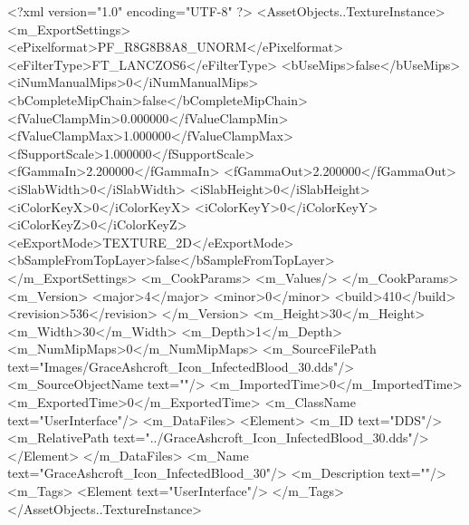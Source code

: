 <?xml version="1.0" encoding="UTF-8" ?>
<AssetObjects..TextureInstance>
	<m_ExportSettings>
		<ePixelformat>PF_R8G8B8A8_UNORM</ePixelformat>
		<eFilterType>FT_LANCZOS6</eFilterType>
		<bUseMips>false</bUseMips>
		<iNumManualMips>0</iNumManualMips>
		<bCompleteMipChain>false</bCompleteMipChain>
		<fValueClampMin>0.000000</fValueClampMin>
		<fValueClampMax>1.000000</fValueClampMax>
		<fSupportScale>1.000000</fSupportScale>
		<fGammaIn>2.200000</fGammaIn>
		<fGammaOut>2.200000</fGammaOut>
		<iSlabWidth>0</iSlabWidth>
		<iSlabHeight>0</iSlabHeight>
		<iColorKeyX>0</iColorKeyX>
		<iColorKeyY>0</iColorKeyY>
		<iColorKeyZ>0</iColorKeyZ>
		<eExportMode>TEXTURE_2D</eExportMode>
		<bSampleFromTopLayer>false</bSampleFromTopLayer>
	</m_ExportSettings>
	<m_CookParams>
		<m_Values/>
	</m_CookParams>
	<m_Version>
		<major>4</major>
		<minor>0</minor>
		<build>410</build>
		<revision>536</revision>
	</m_Version>
	<m_Height>30</m_Height>
	<m_Width>30</m_Width>
	<m_Depth>1</m_Depth>
	<m_NumMipMaps>0</m_NumMipMaps>
	<m_SourceFilePath text="Images/GraceAshcroft_Icon_InfectedBlood_30.dds"/>
	<m_SourceObjectName text=""/>
	<m_ImportedTime>0</m_ImportedTime>
	<m_ExportedTime>0</m_ExportedTime>
	<m_ClassName text="UserInterface"/>
	<m_DataFiles>
		<Element>
			<m_ID text="DDS"/>
			<m_RelativePath text="../GraceAshcroft_Icon_InfectedBlood_30.dds"/>
		</Element>
	</m_DataFiles>
	<m_Name text="GraceAshcroft_Icon_InfectedBlood_30"/>
	<m_Description text=""/>
	<m_Tags>
		<Element text="UserInterface"/>
	</m_Tags>
</AssetObjects..TextureInstance>
